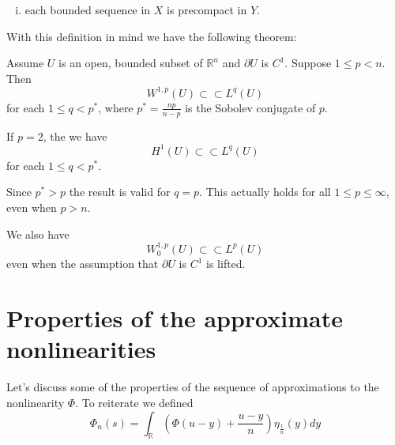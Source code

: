 \documentclass[11pt, a4paper]{article}
\begin{document}
\begin{appendix}
\begin{mydef}
\begin{enumerate}[i)]
	\item each bounded sequence in $X$ is precompact in $Y$.
\end{enumerate}
\end{mydef}

With this definition in mind we have the following theorem:
\begin{theorem}
\label{thm:Rellich}
Assume $U$ is an open, bounded subset of $\mathbb{R}^n$ and $\partial U$ is $C^1$.
Suppose $1\leq p < n$. Then
\begin{equation}
\label{Rellich}
W^{1,p}(U) \subset \subset L^q(U)
\end{equation}
for each $1\leq q < p^*$, where $p^* = \frac{np}{n-p}$ is the Sobolev conjugate of $p$.
\end{theorem}
\setcounter{rem}{0}
\begin{rem}
If $p=2$, the we have
\begin{equation*}
H^1(U) \subset \subset L^q(U)
\end{equation*}
for each $1\leq q < p^*$.
\end{rem}
\begin{rem}
Since $p^* > p$ the result is valid for $q=p$. This actually holds for all $1\leq p \leq \infty$, even when $p > n$.
\end{rem}
\begin{rem}
We also have 
\begin{equation*}
W^{1,p}_0(U) \subset \subset L^p(U)
\end{equation*}
even when the assumption that $\partial U$ is $C^1$ is lifted.
\end{rem}


\newpage
\section{Properties of the approximate nonlinearities}
Let's discuss some of the properties of the sequence of approximations to the nonlinearity $\Phi$. To reiterate we defined
\begin{equation*}
\Phi_n(s) = \int_\mathbb{R}\left( \Phi(u-y) + \frac{u-y}{n}\right) \eta_{\frac{1}{n}}(y)dy
\end{equation*}




\end{appendix}
\end{document}
